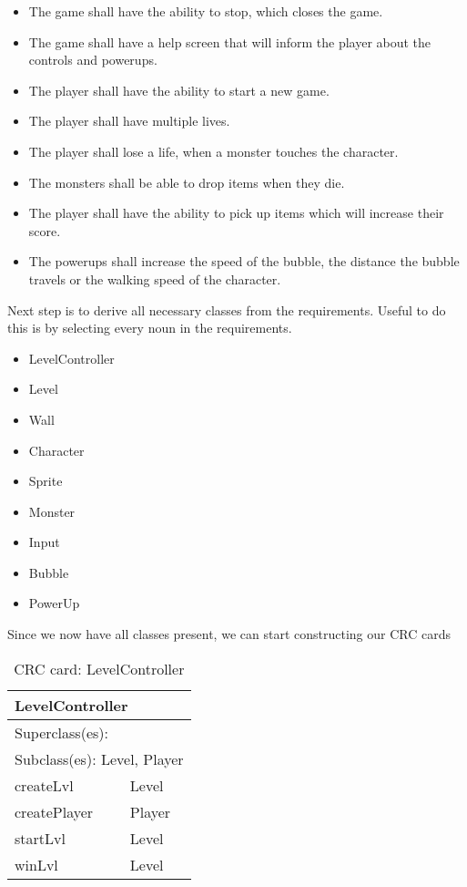 \begin{itemize}
   \item The game shall have the ability to stop, which closes the game.
   \item The game shall have a help screen that will inform the player about the controls and powerups.
   \item The player shall have the ability to start a new game.
   \item The player shall have multiple lives.
   \item The player shall lose a life, when a monster touches the character. 
   \item The monsters shall be able to drop items when they die.
   \item The player shall have the ability to pick up items which will increase their score.
   \item The powerups shall increase the speed of the bubble, the distance the bubble travels or the walking speed of the character.
\end{itemize}

Next step is to derive all necessary classes from the requirements. Useful to do this is by selecting every noun in the requirements. 
\begin{itemize}
    \item LevelController
    \item Level
    \item Wall
    \item Character
    \item Sprite
    \item Monster
    \item Input
    \item Bubble
    \item PowerUp
\end{itemize}

Since we now have all classes present, we can start constructing our CRC cards

\begin{table}[]
\centering
\label{crc_levelcontroller}
\begin{tabular}{|l|l|}
\hline
\multicolumn{2}{|l|}{LevelController} \\ \hline
\multicolumn{2}{|l|}{Superclass(es):} \\ \hline
\multicolumn{2}{|l|}{Subclass(es): Level, Player} \\ \hline
createLvl               & Level \\ \hline
createPlayer            & Player \\ \hline
startLvl                & Level \\ \hline
winLvl                  & Level \\ \hline
\end{tabular}
\caption{CRC card: LevelController}
\end{table}

